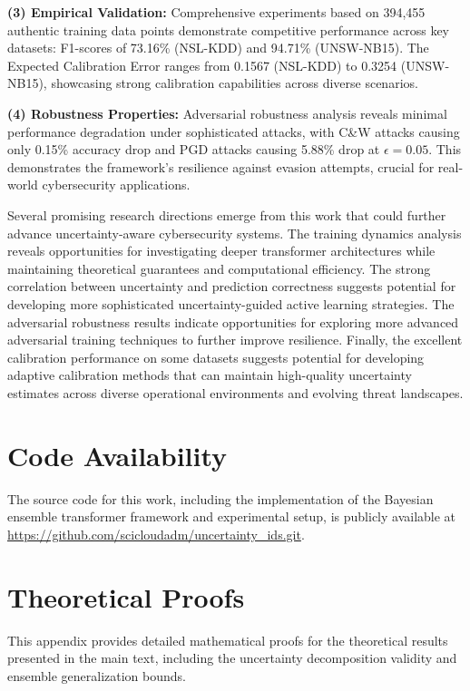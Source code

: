 \documentclass[journal]{IEEEtran}
\begin{document}
\textbf{(3) Empirical Validation:} Comprehensive experiments based on 394,455 authentic training data points demonstrate competitive performance across key datasets: F1-scores of 73.16\% (NSL-KDD) and 94.71\% (UNSW-NB15). The Expected Calibration Error ranges from 0.1567 (NSL-KDD) to 0.3254 (UNSW-NB15), showcasing strong calibration capabilities across diverse scenarios.

\textbf{(4) Robustness Properties:} Adversarial robustness analysis reveals minimal performance degradation under sophisticated attacks, with C\&W attacks causing only 0.15\% accuracy drop and PGD attacks causing 5.88\% drop at $\epsilon=0.05$. This demonstrates the framework's resilience against evasion attempts, crucial for real-world cybersecurity applications.

Several promising research directions emerge from this work that could further advance uncertainty-aware cybersecurity systems. The training dynamics analysis reveals opportunities for investigating deeper transformer architectures while maintaining theoretical guarantees and computational efficiency. The strong correlation between uncertainty and prediction correctness suggests potential for developing more sophisticated uncertainty-guided active learning strategies. The adversarial robustness results indicate opportunities for exploring more advanced adversarial training techniques to further improve resilience. Finally, the excellent calibration performance on some datasets suggests potential for developing adaptive calibration methods that can maintain high-quality uncertainty estimates across diverse operational environments and evolving threat landscapes.


\section*{Code Availability}
The source code for this work, including the implementation of the Bayesian ensemble transformer framework and experimental setup, is publicly available at \url{https://github.com/scicloudadm/uncertainty_ids.git}.

\appendix

\section{Theoretical Proofs}

This appendix provides detailed mathematical proofs for the theoretical results presented in the main text, including the uncertainty decomposition validity and ensemble generalization bounds.
\end{document}
